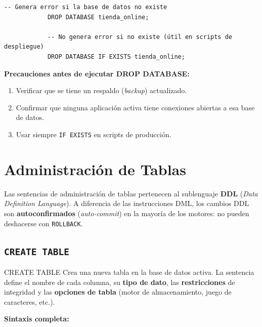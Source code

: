 \documentclass[12pt, a4paper]{article}
\begin{document}
	\begin{ejemplo}
		\begin{lstlisting}[style=sql, caption={DROP DATABASE con y sin guarda}]
			-- Genera error si la base de datos no existe
			DROP DATABASE tienda_online;
			
			-- No genera error si no existe (útil en scripts de despliegue)
			DROP DATABASE IF EXISTS tienda_online;
		\end{lstlisting}
	\end{ejemplo}
	
	\begin{nota}
		\textbf{Precauciones antes de ejecutar DROP DATABASE:}
		\begin{enumerate}
			\item Verificar que se tiene un respaldo (\textit{backup}) actualizado.
			\item Confirmar que ninguna aplicación activa tiene conexiones abiertas
			a esa base de datos.
			\item Usar siempre \texttt{IF EXISTS} en scripts de producción.
		\end{enumerate}
	\end{nota}
	
	\newpage
	\section{Administración de Tablas}
	
	Las sentencias de administración de tablas pertenecen al sublenguaje
	\textbf{DDL} (\textit{Data Definition Language}). A diferencia de las
	instrucciones DML, los cambios DDL son \textbf{autoconfirmados}
	(\textit{auto-commit}) en la mayoría de los motores: no pueden deshacerse
	con \texttt{ROLLBACK}.
	
	\subsection{\texttt{CREATE TABLE}}
	
	\begin{definicion}{CREATE TABLE}
		Crea una nueva tabla en la base de datos activa. La sentencia define el
		nombre de cada columna, su \textbf{tipo de dato}, las
		\textbf{restricciones} de integridad y las \textbf{opciones de tabla}
		(motor de almacenamiento, juego de caracteres, etc.).
	\end{definicion}
	
	\textbf{Sintaxis completa:}
	
\end{document}
